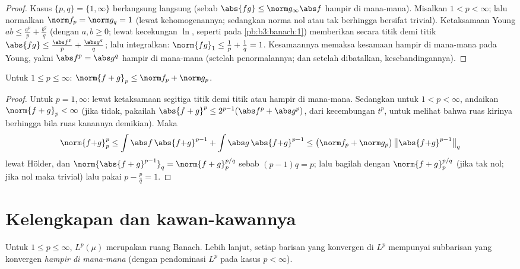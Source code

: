 \begin{proof}
Kasus $\{p, q\} = \{1, \infty\}$ berlangsung langsung (sebab $\abs{fg} \leq
\norm g_\infty\abs f$ hampir di mana-mana). Misalkan $1 < p < \infty$; lalu normalkan
$\norm f_p = \norm g_q = 1$ (lewat kehomogenannya; sedangkan norma nol atau tak
berhingga bersifat trivial). Ketaksamaan Young $ab \leq \frac{a^p}p +
\frac{b^q}q$ (dengan $a, b \geq 0$; lewat kecekungan $\ln$, seperti pada
\cref{pb:b3:banach:1}) memberikan secara titik demi titik $\abs{f g} \leq
\frac{\abs f^p}p + \frac{\abs g^q}q$; lalu integralkan: $\norm{fg}_1
\leq \frac1p + \frac1q = 1$. Kesamaannya memaksa kesamaan hampir di mana-mana pada
Young, yakni $\abs f^p = \abs g^q$ hampir di mana-mana (setelah
penormalannya; dan setelah dibatalkan, kesebandingannya).
\end{proof}

\begin{theorem}\label{thm:b3:lp:minkowski}
Untuk $1 \leq p \leq \infty$: $\norm{f + g}_p \leq \norm f_p +
\norm g_p$.
\end{theorem}

\begin{proof}
Untuk $p = 1, \infty$: lewat ketaksamaan segitiga titik demi titik atau hampir di mana-mana. Sedangkan untuk $1 <
p < \infty$, andaikan $\norm{f+g}_p < \infty$ (jika tidak, pakailah
$\abs{f+g}^p \leq 2^{p-1}(\abs f^p + \abs g^p)$, dari kecembungan
$t^p$, untuk melihat bahwa ruas kirinya berhingga bila ruas kanannya demikian).
Maka
\[
\norm{f{+}g}_p^p \leq \int\abs f\,\abs{f{+}g}^{p-1} +
\int\abs g\,\abs{f{+}g}^{p-1}
\leq \bigl(\norm f_p + \norm g_p\bigr)\,
\bigl\|\abs{f{+}g}^{p-1}\bigr\|_q
\]
lewat Hölder, dan $\norm{\abs{f+g}^{p-1}}_q =
\norm{f+g}_p^{p/q}$ sebab $(p-1)q = p$; lalu bagilah dengan
$\norm{f+g}_p^{p/q}$ (jika tak nol; jika nol maka trivial) lalu pakai $p -
\frac pq = 1$.
\end{proof}

\section{Kelengkapan dan kawan-kawannya}

\begin{theorem}\label{thm:b3:lp:complete}
Untuk $1 \leq p \leq \infty$, $L^p(\mu)$ merupakan ruang Banach.
Lebih lanjut, setiap barisan yang konvergen di $L^p$ mempunyai subbarisan
yang konvergen \emph{hampir di mana-mana} (dengan pendominasi $L^p$
pada kasus $p < \infty$).
\end{theorem}


